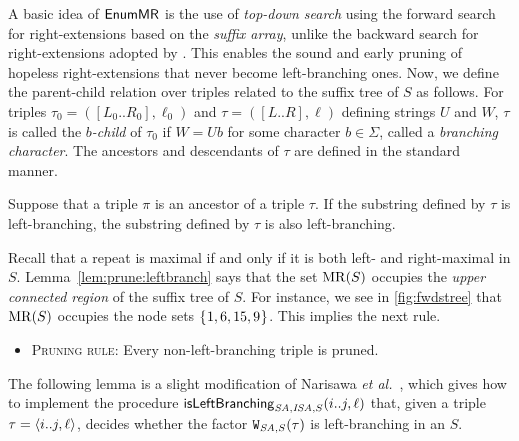 A basic idea of $\textsf{EnumMR}$ is the use of \textit{top-down search} using the forward search for right-extensions based on the \textit{suffix array}, unlike the backward search for right-extensions adopted by \TDBW.
This enables the sound and early pruning of hopeless right-extensions that never become left-branching ones.
Now, we define the parent-child relation over triples related to the suffix tree of $S$ as follows. For triples $\tau_0 = ([L_0..R_0], \ell_0)$ and $\tau = ([L..R], \ell)$ defining strings $U$ and $W$, $\tau$ is called the \textit{$b$-child} of $\tau_0$ if $W = Ub$ for some character $b \in \Sigma$, called a \textit{branching character}. The ancestors and descendants of $\tau$ are defined in the standard manner.

\begin{lemma}\label{lem:prune:leftbranch}
Suppose that a triple $\pi$ is an ancestor of a triple $\tau$. If the substring defined by $\tau$ is left-branching, the substring defined by $\tau$ is also left-branching. 
\end{lemma}

Recall that a repeat is maximal if and only if it is both left- and right-maximal in $S$. Lemma~\cref{lem:prune:leftbranch} says that the set $\mathrm{MR}(S)$ occupies the \textit{upper connected region} of the suffix tree of $S$. For instance, we see in \cref{fig:fwdstree} that $\mathrm{MR}(S)$ occupies the node sets $\{\kern0.05em1,6,15,9\kern0.05em\}$. 
This implies the next rule.

\begin{itemize}\item[]
\quad\textsc{Pruning rule}: {Every non-left-branching triple is pruned.}
\end{itemize}


The following lemma is a slight modification of Narisawa \textit{et al.}~\cite[Lemma~10]{narisawa2007efficient}, which gives how to implement the procedure $\mbox{\textsf{isLeftBranching}}_{{\mathit{SA}, \mathit{ISA}, S}}(i..j, \ell)$ that, given a triple $\tau = \langle i..j, \ell\rangle$, decides whether the factor $\mathtt{W}_{{\mathit{SA}, S}}(\tau)$ is left-branching in an $S$. 
 




